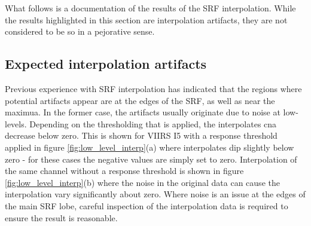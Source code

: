 What follows is a documentation of the results of the SRF interpolation. While the results highlighted in this section are interpolation artifacts, they are not considered to be so in a pejorative sense.

\subsection{Expected interpolation artifacts}
Previous experience with SRF interpolation has indicated that the regions where potential artifacts appear are at the edges of the SRF, as well as near the maximua. In the former case, the artifacts usually originate due to noise at low-levels. Depending on the thresholding that is applied, the interpolates cna decrease below zero. This is shown for VIIRS I5 with a response threshold applied in figure \ref{fig:low_level_interp}(a) where interpolates dip slightly below zero - for these cases the negative values are simply set to zero. Interpolation of the same channel without a response threshold is shown in figure \ref{fig:low_level_interp}(b) where the noise in the original data can cause the interpolation vary significantly about zero. Where noise is an issue at the edges of the main SRF lobe, careful inspection of the interpolation data is required to ensure the result is reasonable. 

